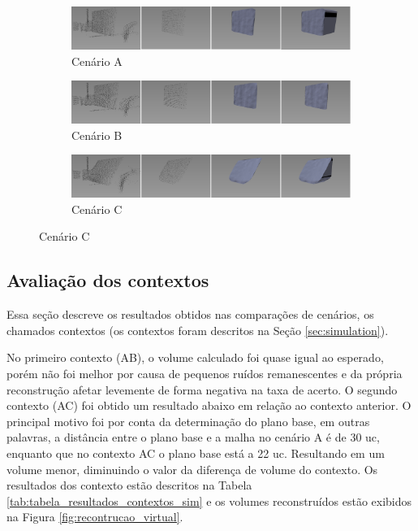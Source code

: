 \begin{figure}[H]
    \centering
    \caption{Reconstrução dos cenários em simulação virtual.}
    \label{fig:recontrucao_virtual}
    \begin{subfigure}[t]{\textwidth}
        \includegraphics[width=\textwidth]{dados/figuras/wall3.png}
        \caption{Cenário A}
    \end{subfigure}
    \begin{subfigure}[t]{\textwidth}
        \includegraphics[width=\textwidth]{dados/figuras/wall.png}
        \caption{Cenário B}
    \end{subfigure}
    \begin{subfigure}[t]{\textwidth}
        \includegraphics[width=\textwidth]{dados/figuras/declined.png}
        \caption{Cenário C}
    \end{subfigure}
\end{figure}

\subsection{Avaliação dos contextos}
\label{sec:avaliacao_contextos}

Essa seção descreve os resultados obtidos nas comparações de cenários, os chamados contextos (os contextos foram descritos na Seção \ref{sec:simulation}).

No primeiro contexto (AB), o volume calculado foi quase igual ao esperado, porém não foi melhor por causa de pequenos ruídos remanescentes e da própria reconstrução afetar levemente de forma negativa na taxa de acerto.
O segundo contexto (AC) foi obtido um resultado abaixo em relação ao contexto anterior.
O principal motivo foi por conta da determinação do plano base, em outras palavras, a distância entre o plano base e a malha no cenário A é de 30 uc, enquanto que no contexto AC o plano base está a 22 uc.
Resultando em um volume menor, diminuindo o valor da diferença de volume do contexto.
Os resultados dos contexto estão descritos na Tabela \ref{tab:tabela_resultados_contextos_sim} e os volumes reconstruídos estão exibidos na Figura \ref{fig:recontrucao_virtual}.

